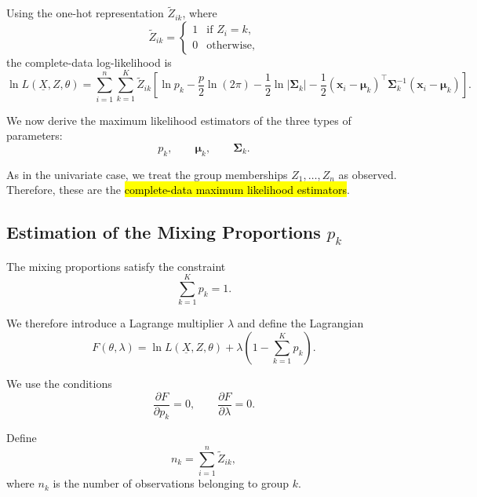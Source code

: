 Using the one-hot representation $\tilde{Z}_{ik}$, where
\begin{equation*}
\tilde{Z}_{ik}
=
\begin{cases}
1 & \text{if } Z_i=k,\\
0 & \text{otherwise},
\end{cases}
\end{equation*}
the complete-data log-likelihood is
\begin{equation*}
\ln L(\underline{X},Z,\theta)
=
\sum_{i=1}^{n}\sum_{k=1}^{K}
\tilde{Z}_{ik}
\left[
\ln p_k
-\frac{p}{2}\ln(2\pi)
-\frac{1}{2}\ln|\boldsymbol{\Sigma}_k|
-\frac{1}{2}
(\boldsymbol{x}_i-\boldsymbol{\mu}_k)^\top
\boldsymbol{\Sigma}_k^{-1}
(\boldsymbol{x}_i-\boldsymbol{\mu}_k)
\right].
\end{equation*}

We now derive the maximum likelihood estimators of the three types
of parameters:
\begin{equation*}
p_k,\qquad
\boldsymbol{\mu}_k,\qquad
\boldsymbol{\Sigma}_k.
\end{equation*}

As in the univariate case, we treat the group memberships
$Z_1,\ldots,Z_n$ as observed. Therefore, these are the
\hl{complete-data maximum likelihood estimators}.


\subsection{Estimation of the Mixing Proportions $p_k$}

The mixing proportions satisfy the constraint
\begin{equation*}
\sum_{k=1}^Kp_k=1.
\end{equation*}

We therefore introduce a Lagrange multiplier $\lambda$ and define
the Lagrangian
\begin{equation*}
F(\theta,\lambda)
=
\ln L(\underline{X},Z,\theta)
+
\lambda
\left(
1-\sum_{k=1}^Kp_k
\right).
\end{equation*}

We use the conditions
\begin{equation*}
\frac{\partial F}{\partial p_k}=0,
\qquad
\frac{\partial F}{\partial\lambda}=0.
\end{equation*}

Define
\begin{equation*}
n_k
=
\sum_{i=1}^n\tilde{Z}_{ik},
\end{equation*}
where $n_k$ is the number of observations belonging to group $k$.

